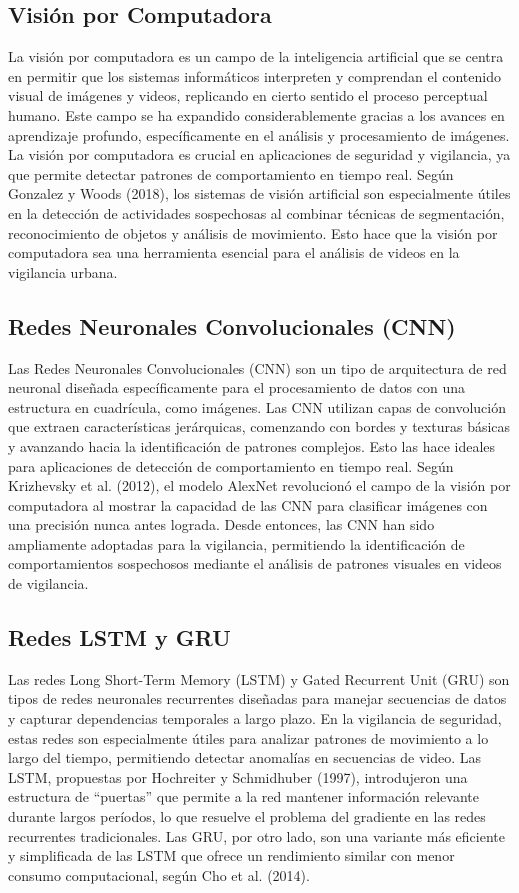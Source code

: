 \subsection{Visión por Computadora}
La visión por computadora es un campo de la inteligencia artificial que se centra en permitir que los sistemas informáticos interpreten y comprendan el contenido visual de imágenes y videos, replicando en cierto sentido el proceso perceptual humano. Este campo se ha expandido considerablemente gracias a los avances en aprendizaje profundo, específicamente en el análisis y procesamiento de imágenes. La visión por computadora es crucial en aplicaciones de seguridad y vigilancia, ya que permite detectar patrones de comportamiento en tiempo real. Según Gonzalez y Woods (2018), los sistemas de visión artificial son especialmente útiles en la detección de actividades sospechosas al combinar técnicas de segmentación, reconocimiento de objetos y análisis de movimiento. Esto hace que la visión por computadora sea una herramienta esencial para el análisis de videos en la vigilancia urbana.

\subsection{Redes Neuronales Convolucionales (CNN)}
Las Redes Neuronales Convolucionales (CNN) son un tipo de arquitectura de red neuronal diseñada específicamente para el procesamiento de datos con una estructura en cuadrícula, como imágenes. Las CNN utilizan capas de convolución que extraen características jerárquicas, comenzando con bordes y texturas básicas y avanzando hacia la identificación de patrones complejos. Esto las hace ideales para aplicaciones de detección de comportamiento en tiempo real. Según Krizhevsky et al. (2012), el modelo AlexNet revolucionó el campo de la visión por computadora al mostrar la capacidad de las CNN para clasificar imágenes con una precisión nunca antes lograda. Desde entonces, las CNN han sido ampliamente adoptadas para la vigilancia, permitiendo la identificación de comportamientos sospechosos mediante el análisis de patrones visuales en videos de vigilancia.

\subsection{Redes LSTM y GRU}
Las redes Long Short-Term Memory (LSTM) y Gated Recurrent Unit (GRU) son tipos de redes neuronales recurrentes diseñadas para manejar secuencias de datos y capturar dependencias temporales a largo plazo. En la vigilancia de seguridad, estas redes son especialmente útiles para analizar patrones de movimiento a lo largo del tiempo, permitiendo detectar anomalías en secuencias de video. Las LSTM, propuestas por Hochreiter y Schmidhuber (1997), introdujeron una estructura de “puertas” que permite a la red mantener información relevante durante largos períodos, lo que resuelve el problema del gradiente en las redes recurrentes tradicionales. Las GRU, por otro lado, son una variante más eficiente y simplificada de las LSTM que ofrece un rendimiento similar con menor consumo computacional, según Cho et al. (2014).


